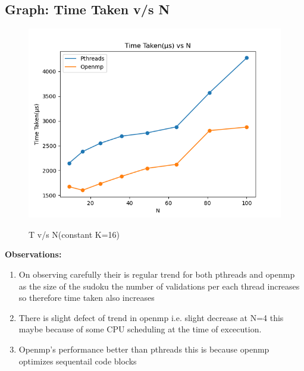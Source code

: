 \documentclass[10pt,a4paper]{article}
\begin{document}
\subsection{Graph: Time Taken v/s N}
\begin{figure}[!ht]
\includegraphics[scale = 0.8]{plot_const_K}
\label{Fig}
\caption{T v/s N(constant K=16)}
\end{figure}
\textbf{Observations:}
\begin{enumerate}
\item On observing carefully their is regular trend for both pthreads and openmp as the size of the sudoku the number of validations per each thread increases so therefore time taken also increases
\item There is slight defect of trend in openmp i.e. slight decrease at N=4  this maybe because of some CPU scheduling at the time of excecution.
\item Openmp's performance better than pthreads this is because openmp optimizes sequentail code blocks 
\end{enumerate}
\pagebreak
\end{document}
